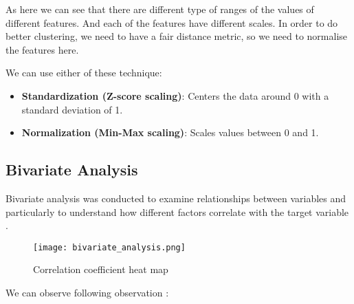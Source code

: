 \documentclass[12pt]{article}
\begin{document}
As here we can see that there are different type of ranges of the values of different features. And each of the features have different scales. In order to do better clustering, we need to have a fair distance metric, so we need to normalise the features here. 


We can use either of these technique:
\begin{itemize}
    \item \textbf{Standardization (Z-score scaling)}: Centers the data around 0 with a standard deviation of 1.
    \item \textbf{Normalization (Min-Max scaling)}: Scales values between 0 and 1.
\end{itemize}


\subsection{Bivariate Analysis}

Bivariate analysis was conducted to examine relationships between variables and particularly to understand how different factors correlate with the target variable .


\begin{figure}[h]
    \centering
    \texttt{[image: bivariate\_analysis.png]}
    \caption{Correlation coefficient heat map}
    \label{fig:example}
\end{figure}

We can observe following observation :
\end{document}
